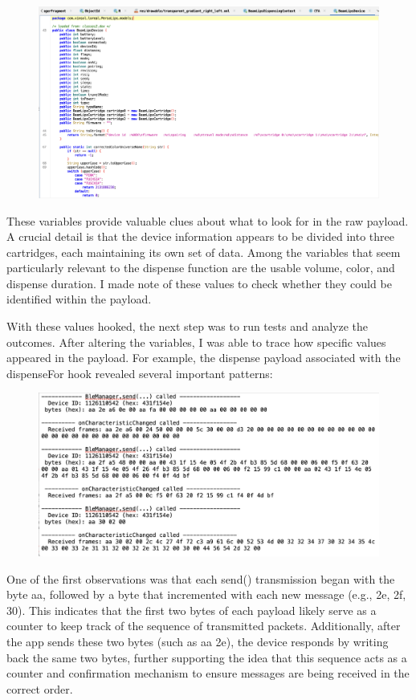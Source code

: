 \begin{figure}[H]
	\centering
	\includegraphics[width=0.7\linewidth]{beamlipsmodel}
	\caption{}
	\label{fig:beamlipsmodel}
\end{figure}

These variables provide valuable clues about what to look for in the raw payload. A crucial detail is that the device information appears to be divided into three cartridges, each maintaining its own set of data. Among the variables that seem particularly relevant to the dispense function are the usable volume, color, and dispense duration. I made note of these values to check whether they could be identified within the payload.

With these values hooked, the next step was to run tests and analyze the outcomes. After altering the variables, I was able to trace how specific values appeared in the payload. For example, the dispense payload associated with the dispenseFor hook revealed several important patterns:

\begin{figure}[H]
	\centering
	\includegraphics[width=0.7\linewidth]{payload1}
	\caption{}
	\label{fig:payload1}
\end{figure}

One of the first observations was that each send() transmission began with the byte aa, followed by a byte that incremented with each new message (e.g., 2e, 2f, 30). This indicates that the first two bytes of each payload likely serve as a counter to keep track of the sequence of transmitted packets. Additionally, after the app sends these two bytes (such as aa 2e), the device responds by writing back the same two bytes, further supporting the idea that this sequence acts as a counter and confirmation mechanism to ensure messages are being received in the correct order.

